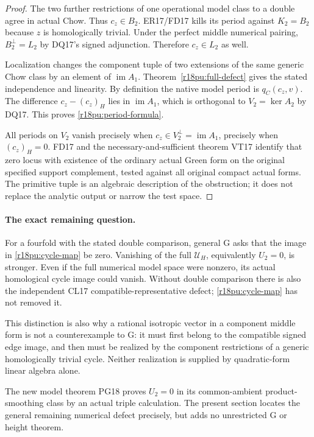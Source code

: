 \begin{proof}
The two further restrictions of one operational model class
to a double agree in actual Chow.  Thus $c_z\in B_2$.
ER17/FD17 kills its period against $K_2=B_2$ because $z$
is homologically trivial.  Under the perfect middle
numerical pairing, $B_2^\perp=L_2$ by DQ17's signed
adjunction.  Therefore $c_z\in L_2$ as well.

Localization changes the component tuple of two extensions
of the same generic Chow class by an element of
$\operatorname{im}A_1$.  Theorem~\ref{r18pu:full-defect}
gives the stated independence and linearity.
By definition the native model period is $q_C(c_z,v)$.
The difference $c_z-(c_z)_H$ lies in $\operatorname{im}A_1$,
which is orthogonal to $V_2=\ker A_2$ by DQ17.
This proves \eqref{r18pu:period-formula}.

All periods on $V_2$ vanish precisely when
$c_z\in V_2^\perp=\operatorname{im}A_1$, precisely when
$(c_z)_H=0$.  FD17 and the necessary-and-sufficient theorem
VT17 identify that zero locus with existence of the
ordinary actual Green form on the original specified
support complement, tested against all original compact
actual forms.  The primitive tuple is an algebraic
description of the obstruction; it does not replace the
analytic output or narrow the test space.
\end{proof}

\paragraph{The exact remaining question.}
For a fourfold with the stated double comparison, general G asks
that the image in \eqref{r18pu:cycle-map} be zero.  Vanishing of
the full $\mathscr U_H$, equivalently $U_2=0$, is stronger.
Even if the full numerical model space were nonzero, its actual
homological cycle image could vanish.  Without double comparison
there is also the independent CL17 compatible-representative
defect; \eqref{r18pu:cycle-map} has not removed it.

This distinction is also why a rational isotropic vector in a
component middle form is not a counterexample to G: it must
first belong to the compatible signed edge image, and then
must be realized by the component restrictions of a generic
homologically trivial cycle.  Neither realization is supplied
by quadratic-form linear algebra alone.

The new model theorem PG18 proves $U_2=0$ in its common-ambient
product-smoothing class by an actual triple calculation.
The present section locates the general remaining numerical
defect precisely, but adds no unrestricted G or height theorem.
